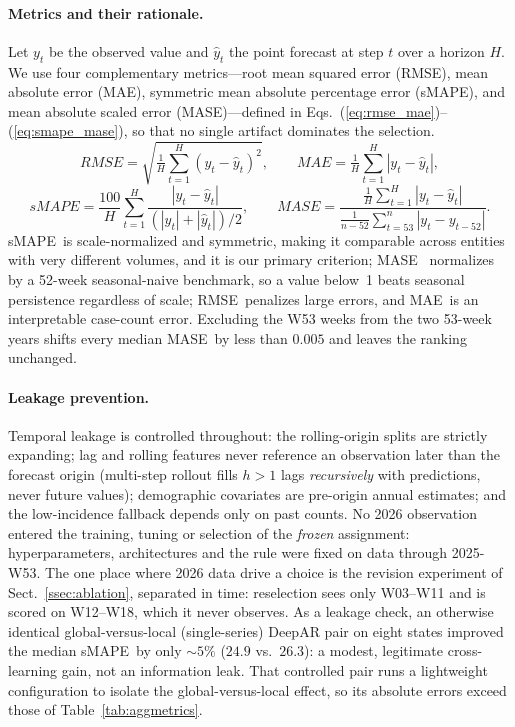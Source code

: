 \documentclass[runningheads]{llncs}
\newcommand{\smape}{sMAPE}
\newcommand{\mase}{MASE}
\newcommand{\rmse}{RMSE}
\newcommand{\mae}{MAE}
\begin{document}
\paragraph{Metrics and their rationale.}
Let $y_t$ be the observed value and $\hat{y}_t$ the point forecast at
step $t$ over a horizon $H$. We use four complementary metrics---root
mean squared error (\rmse), mean absolute error (\mae), symmetric
mean absolute percentage error (\smape), and mean absolute scaled
error (\mase)---defined in Eqs.~(\ref{eq:rmse_mae})--(\ref{eq:smape_mase}),
so that no single artifact dominates the selection.
\begin{equation}
\rmse = \sqrt{\tfrac{1}{H}\textstyle\sum_{t=1}^{H}(y_t-\hat{y}_t)^{2}},
\qquad
\mae = \tfrac{1}{H}\textstyle\sum_{t=1}^{H}|y_t-\hat{y}_t|,
\label{eq:rmse_mae}
\end{equation}
\begin{equation}
\smape = \frac{100}{H}\sum_{t=1}^{H}
\frac{|y_t-\hat{y}_t|}{(|y_t|+|\hat{y}_t|)/2},
\qquad
\mase = \frac{\frac{1}{H}\sum_{t=1}^{H}|y_t-\hat{y}_t|}
            {\frac{1}{n-52}\sum_{t=53}^{n}|y_t-y_{t-52}|}.
\label{eq:smape_mase}
\end{equation}
\smape\ is scale-normalized and symmetric, making it comparable across
entities with very different volumes, and it is our primary criterion;
\mase~\cite{hyndman2006} normalizes by a 52-week seasonal-naive
benchmark, so a value below~1 beats seasonal persistence regardless of
scale; \rmse\ penalizes large errors, and \mae\ is an interpretable
case-count error. Excluding the W53 weeks from the two 53-week years
shifts every median \mase\ by less than $0.005$ and leaves the ranking
unchanged.

\paragraph{Leakage prevention.}
Temporal leakage is controlled throughout: the rolling-origin splits
are strictly expanding; lag and rolling features never reference an
observation later than the forecast origin (multi-step rollout fills
$h{>}1$ lags \emph{recursively} with predictions, never future values);
demographic covariates are pre-origin annual estimates; and the
low-incidence fallback depends only on past counts. No 2026 observation entered the
training, tuning or selection of the \emph{frozen} assignment:
hyperparameters, architectures and the rule were fixed on data through
2025-W53. The one place where 2026 data drive a choice is the revision
experiment of Sect.~\ref{ssec:ablation}, separated in time: reselection
sees only W03--W11 and is scored on W12--W18, which it never observes. As a leakage check, an otherwise
identical global-versus-local (single-series) DeepAR pair on eight
states improved the
median \smape\ by only ${\sim}5\%$ ($24.9$ vs.\ $26.3$): a modest,
legitimate cross-learning gain, not an information
leak. That controlled pair runs a lightweight configuration to isolate
the global-versus-local effect, so its absolute errors exceed those of
Table~\ref{tab:aggmetrics}.
\end{document}
